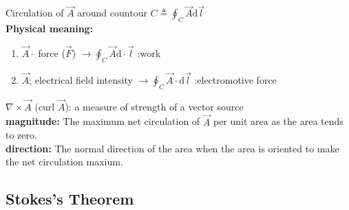 \documentclass[12pt, a4paper]{article}
\begin{document}
Circulation of $\vec{A}$ around countour $C \triangleq \oint_C \vec{A} \text{d} \vec{l}$ \\

\textbf{Physical meaning:}

\begin{enumerate}[label=\textcircled{\arabic*}]
	\item $\vec{A} \cdot$ force ($\vec{F}$) $\to \oint_C \vec{A} \text{d} \cdot \vec{l}$ :\quad  work
	
	\item $\vec{A}$; electrical field intensity $\to \oint_C \vec{A} \cdot \text{d} \vec{l}$ :\quad electromotive force
\end{enumerate}

$\nabla \times \vec{A}$ (curl $\vec{A}$): a measure of strength of a vector source \\ 

\textbf{magnitude:} The maximum net circulation of $\vec{A}$ per unit area as the area tends to zero. \\
\textbf{direction:} The normal direction of the area when the area is oriented to make the net circulation maxium.

\subsection*{Stokes's Theorem}
\end{document}
